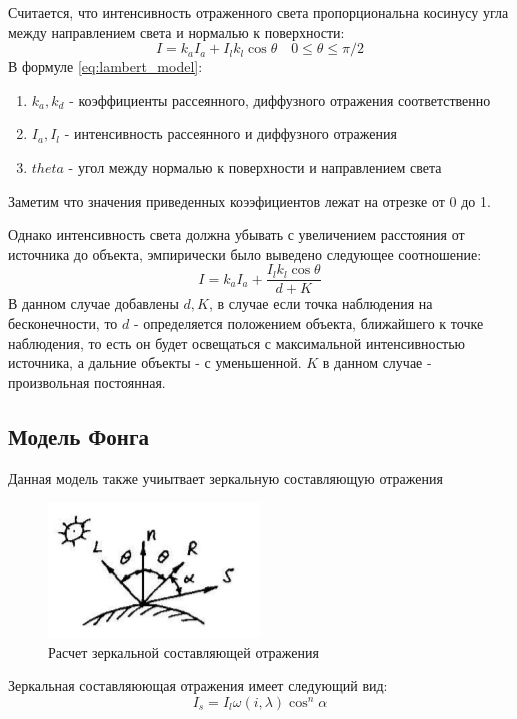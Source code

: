 \documentclass[a4paper,14pt, unknownkeysallowed]{extreport}
\begin{document}
Считается, что интенсивность отраженного света
пропорциональна косинусу угла между направлением света и нормалью к поверхности:
\begin{equation} 
	I = k_aI_a + I_lk_l\cos\theta \quad 0 \leq \theta \leq \pi/2
	\label{eq:lambert_model}
\end{equation}
В  формуле \ref{eq:lambert_model}:
\begin{enumerate}
	\item $k_a,k_d$ - коэффициенты рассеянного, диффузного отражения соответственно
	\item $I_a,I_l$ - интенсивность рассеянного и диффузного отражения 
	\item $theta$ - угол между нормалью к поверхности и направлением света
\end{enumerate}
Заметим что значения приведенных коээфициентов лежат на отрезке от 0 до 1.

Однако интенсивность света должна убывать с увеличением расстояния от источника до объекта, эмпирически было выведено следующее соотношение:
\begin{equation} 
	I = k_aI_a + \frac{I_lk_l\cos\theta}{d + K}
	\label{eq:lambert_model_space}
\end{equation}
В данном случае добавлены $d,K$, в случае если точка наблюдения на бесконечности, то $d$ - определяется положением объекта,
ближайшего к точке наблюдения, то есть он будет освещаться с максимальной интенсивностью источника, а дальние объекты - с уменьшенной.
$K$ в данном случае - произвольная постоянная. \cite{Rodgers}


\subsection{Модель Фонга}
Данная модель также учиытвает зеркальную составляющую отражения
\begin{figure}[h]
	\centering
	\includegraphics{phong_model}
	\caption{Расчет зеркальной составляющей отражения}
	\label{fig:phong_model}
\end{figure}
\newline
Зеркальная составляюющая отражения имеет следующий вид:
\begin{equation} 
	I_s = I_l\omega(i,\lambda)\cos^n \alpha
	\label{eq:phong_model}
\end{equation}
\end{document}
